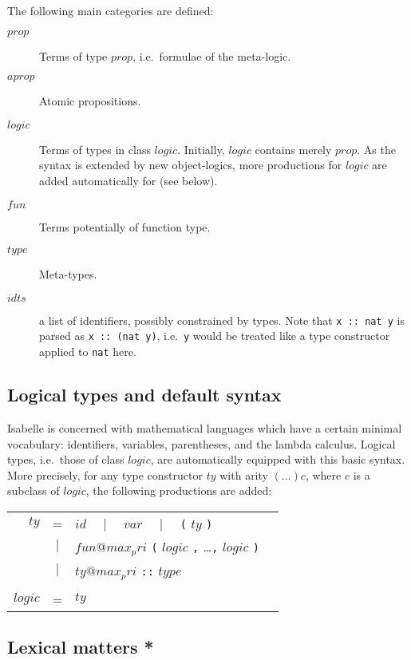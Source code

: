 The following main categories are defined:
\begin{description}
  \item[$prop$] Terms of type $prop$, i.e.\ formulae of the meta-logic.

  \item[$aprop$] Atomic propositions.

  \item[$logic$] Terms of types in class $logic$. Initially, $logic$ contains
    merely $prop$. As the syntax is extended by new object-logics, more
    productions for $logic$ are added automatically for (see below).

  \item[$fun$] Terms potentially of function type.

  \item[$type$] Meta-types.

  \item[$idts$] a list of identifiers, possibly constrained by types. Note
    that \verb|x :: nat y| is parsed as \verb|x :: (nat y)|, i.e.\ {\tt y}
    would be treated like a type constructor applied to {\tt nat} here.
\end{description}


\subsection{Logical types and default syntax}

Isabelle is concerned with mathematical languages which have a certain
minimal vocabulary: identifiers, variables, parentheses, and the lambda
calculus. Logical types, i.e.\ those of class $logic$, are automatically
equipped with this basic syntax. More precisely, for any type constructor
$ty$ with arity $(\dots)c$, where $c$ is a subclass of $logic$, the following
productions are added:
\begin{center}
\begin{tabular}{rclc}
$ty$ &=& $id$ ~~$|$~~ $var$ ~~$|$~~ {\tt(} $ty$ {\tt)} \\
  &$|$& $fun@{max_pri}$ {\tt(} $logic$ {\tt,} \dots {\tt,} $logic$ {\tt)}\\
  &$|$& $ty@{max_pri}$ {\tt::} $type$\\\\
$logic$ &=& $ty$
\end{tabular}
\end{center}


\subsection{Lexical matters *}


